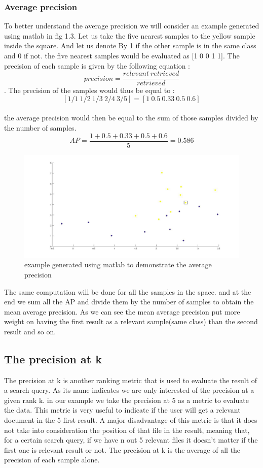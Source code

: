 \documentclass[hidelinks,12pt]{report}
\begin{document}
\subsubsection{Average precision}
To better understand the average precision we will consider an example generated using matlab in fig 1.3. Let us take the five nearest samples to the yellow sample inside the square. And let us denote By 1 if the other sample is in the same class and 0 if not. the five nearest samples would be evaluated as [1 0 0 1 1]. The precision of each sample is given by the following equation : $$precision=\frac{relevant\  retrieved}{retrieved}$$. The precision of the samples would thus be equal to : $$[1/1 \  1/2 \ 1/3\  2/4\  3/5]=[1 \ 0.5 \   0.33 \ 0.5 \ 0.6]$$\\ the average precision would then be equal to the sum of those samples divided by the number of samples.$$AP=\frac{1+0.5+0.33+0.5+0.6}{5}=0.586$$
\begin{figure}[t!]
  
  \centering
	    \includegraphics[width=1\textwidth]{fig1.jpg}
    \caption{example generated using matlab to demonstrate the average precision}
\end{figure}
The same computation will be done for all the samples in the space. and at the end we sum all the AP and divide them by the number of samples to obtain the mean average precision. As we can see the mean average precision put more weight on having the first result as a relevant sample(same class) than the second result and so on.
\subsection{The precision at k}
The precision at k is another ranking metric that is used to evaluate the result of a search query. As  its name indicates we are only interested of the precision at a given rank k. in our example we take the precision at 5 as a metric to evaluate the data. This metric is very useful to indicate if the user will get a relevant document in the 5 first result. A major disadvantage of this metric is that it does not take into consideration the position of that file in the result, meaning that, for a certain search query, if we have n out 5 relevant files it doesn't matter if the first one is relevant result or not. The precision at k is the average of all the precision of each sample alone.
\end{document}
